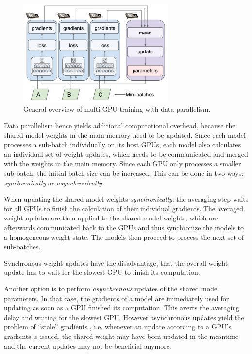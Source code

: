 \begin{figure}[H]
    \centering
    \includegraphics[width=0.7\textwidth]{img_approach/data_parallelism}
    \caption{General overview of multi-GPU training with data parallelism. \cite{geron_hands-machine_2017}}
    \label{fig:data_parallelism}
\end{figure}

Data parallelism hence yields additional computational overhead, because the shared model weights in the main memory need to be updated.
Since each model processes a sub-batch individually on its host GPUs, each model also calculates an individual set of weight updates, which needs to be communicated and merged with the weights in the main memory.
Since each GPU only processes a smaller sub-batch, the initial batch size can be increased.
This can be done in two ways: \textit{synchronically} or \textit{asynchronically}.

When updating the shared model weights \textit{synchronically}, the averaging step waits for all GPUs to finish the calculation of their individual gradients.
The averaged weight updates are then applied to the shared model weights, which are afterwards communicated back to the GPUs and thus synchronize the models to a homogeneous weight-state.
The models then proceed to process the next set of sub-batches.

Synchronous weight updates have the disadvantage, that the overall weight update has to wait for the slowest GPU to finish its computation.

Another option is to perform \textit{asynchronous} updates of the shared model parameters.
In that case, the gradients of a model are immediately used for updating as soon as a GPU finished its computation.
This averts the averaging delay and waiting for the slowest GPU.
However asynchronous updates yield the problem of ``stale'' gradients \cite{geron_hands-machine_2017}, i.e. whenever an update according to a GPU's gradients is issued, the shared weight may have been updated in the meantime and the current updates may not be beneficial anymore.

